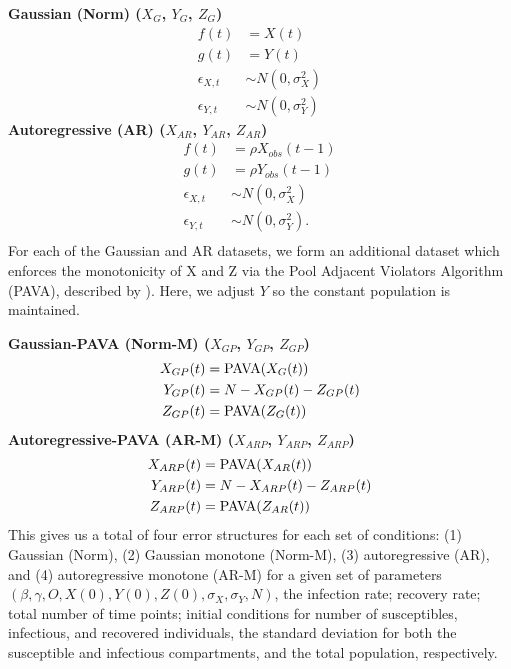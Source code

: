 \documentclass[12pt]{article}
\begin{document}
\noindent \textbf{Gaussian (Norm) ($X_{G}$, $Y_{G}$, $Z_{G}$)}
\begin{align*}
  f(t) &= X(t) \\
  g(t) &= Y(t) \\
  \epsilon_{X,t} &\sim N(0, \sigma_X^2) \\
  \epsilon_{Y,t} &\sim N(0, \sigma_Y^2)
\end{align*}
\textbf{Autoregressive (AR) ($X_{AR}$, $Y_{AR}$, $Z_{AR}$)}
\begin{align*}
  f(t) &= \rho X_{obs}(t-1) \\
  g(t) &= \rho Y_{obs}(t-1) \\
  \epsilon_{X,t} &\sim N(0, \sigma_X^2) \\
  \epsilon_{Y,t} &\sim N(0, \sigma_Y^2).\\
\end{align*}
For each of the Gaussian and AR datasets, we form an additional dataset which enforces the monotonicity of X and Z via the Pool Adjacent Violators Algorithm (PAVA), described by \cite{friedman1984}).  Here, we adjust $Y$ so the constant population is maintained.

\noindent \textbf{Gaussian-PAVA (Norm-M) ($X_{GP}$, $Y_{GP}$, $Z_{GP}$)}
\begin{align*}
 X_{GP}(t) &= \textnormal{PAVA}(X_G(t)) \\
  Y_{GP}(t) &= N - X_{GP}(t) - Z_{GP}(t) \\
  Z_{GP}(t) &= \textnormal{PAVA}(Z_G(t)) \\
\end{align*}
\textbf{Autoregressive-PAVA (AR-M) ($X_{ARP}$, $Y_{ARP}$, $Z_{ARP}$)}
\begin{align*}
  X_{ARP}(t) &= \textnormal{PAVA}(X_{AR}(t)) \\
  Y_{ARP}(t) &= N - X_{ARP}(t) - Z_{ARP}(t) \\
  Z_{ARP}(t) &= \textnormal{PAVA}(Z_{AR}(t)) 
\end{align*}
This gives us a total of four error structures for each set of conditions: (1) Gaussian (Norm), (2) Gaussian monotone (Norm-M),  (3) autoregressive (AR), and (4) autoregressive monotone (AR-M) for a given set of parameters $\left (\beta, \gamma, O, X(0), Y(0), Z(0), \sigma_X, \sigma_Y, N \right )$, the infection rate; recovery rate; total number of time points; initial conditions for number of susceptibles, infectious, and recovered individuals, the standard deviation for both the susceptible and infectious compartments, and the total population, respectively.
\end{document}
